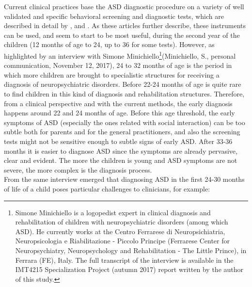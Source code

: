 Current clinical practices base the ASD diagnostic procedure on a variety of well validated and specific behavioral screening and diagnostic tests, which are described in detail by \cite{towie2016screening}, \cite{maganto2017screening} and \cite{charman2013measuerement}. As these articles further describe, these instruments can be used, and seem to start to be most useful, during the second year of the children (12 months of age to 24, up to 36 for some tests). However, as highlighted by an interview with Simone Minichiello\footnote{Simone Minichiello is a logopedist expert in clinical diagnosis and rehabilitation of children with neuropsychiatric disorders (among which ASD). He currently works at the Centro Ferrarese di Neuropsichiatria, Neuropsicologia e Riabilitazione - Piccolo Principe (Ferrarese Center for Neuropsychiatry, Neuropsychology and Rehabilitation - The Little Prince), in Ferrara (FE), Italy. The full transcript of the interview is available in the IMT4215 Specialization Project (autumn 2017) report written by the author of this study.}(Minichiello, S., personal communication, November 12, 2017), 24 to 32 months of age is the period in which more children are brought to specialistic structures for receiving a diagnosis of neuropsychiatric disorders. Before 22-24 months of age is quite rare to find children in this kind of diagnosis and rehabilitation structures. Therefore, from a clinical perspective and with the current methods, the early diagnosis happens around 22 and 24 months of age. Before this age threshold, the early symptoms of ASD (especially the ones related with social interaction) can be too subtle both for parents and for the general practitioners, and also the screening tests might not be sensitive enough to subtle signs of early ASD. After 33-36 months it is easier to diagnose ASD since the symptoms are already pervasive, clear and evident. The more the children is young and ASD symptoms are not severe, the more complex is the diagnosis process.\\
From the same interview emerged that diagnosing ASD in the first 24-30 months of life of a child poses particular challenges to clinicians, for example:

